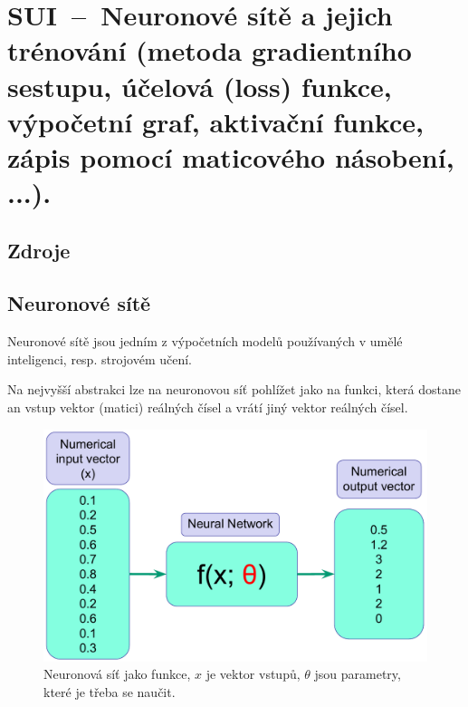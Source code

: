 

\graphicspath{{sui/neuronove_site_a_jejich_trenovani/figures}}


\chapter{SUI~--~Neuronové sítě a jejich trénování (metoda gradientního sestupu, účelová (loss) funkce, výpočetní graf, aktivační funkce, zápis pomocí maticového násobení, ...).}


\section{Zdroje}

\begin{compactitem}
    \item {}
    \item {}
    \item {}
\end{compactitem}


\section{Neuronové sítě}

\begin{compactitem}
    \item Neuronové sítě jsou jedním z výpočetních modelů používaných v umělé inteligenci, resp. strojovém učení.

    \item Na nejvyšší abstrakci lze na neuronovou síť pohlížet jako na funkci, která dostane an vstup vektor (matici) reálných čísel a vrátí jiný vektor reálných čísel.
\end{compactitem}

\begin{figure}[H]
    \centering
    \includegraphics[width=0.65\linewidth]{neural_network_high_level.pdf}
    \caption{Neuronová síť jako funkce, $x$ je vektor vstupů, $\theta$ jsou parametry, které je třeba se naučit.}
\end{figure}

